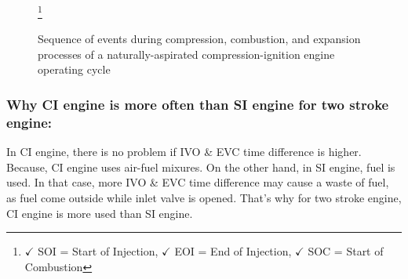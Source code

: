 \documentclass{article}
\begin{document}
\begin{figure}
	\centering
  
	\hfill
	
	\hfill
  
	\caption{Sequence of events during compression, combustion, and	expansion processes of a naturally-aspirated compression-ignition engine operating cycle}\footnote[1]{$\checkmark$ SOI = Start of Injection, $\checkmark$ EOI = End of Injection, $\checkmark$ SOC = Start of Combustion}
	\label{fig:overall}
  \end{figure}

 \subsubsection*{Why CI engine is more often than SI engine for two stroke engine:}
 In CI engine, there is no problem if IVO \& EVC time difference is higher. Because, CI engine uses air-fuel mixures. On the other hand, in SI engine, fuel is used. In that case, more IVO \& EVC time difference may cause a waste of fuel, as fuel come outside while inlet valve is opened. That's why for two stroke engine, CI engine is more used than SI engine. 
\end{document}
